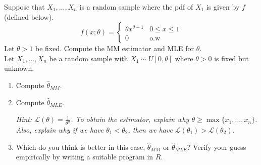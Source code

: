 \exerciseitem Suppose that $X_1, \ldots, X_n$ is a random sample where the pdf of $X_1$ is given by $f$ (defined below).
\[
	f(x;\theta) = 
	\begin{cases}
		\theta x^{\theta-1} & 0\leq x \leq 1 \\
		0 & \text{o.w}
	\end{cases}
\]
Let $\theta > 1$ be fixed. Compute the MM estimator and MLE for $\theta$.\\

\exerciseitem Let $X_1, \ldots, X_n$ be a random sample with $X_1 \sim U[0,\theta]$ where $\theta > 0$ is fixed but unknown.
\begin{enumerate}
	\item Compute $\hat{\theta}_{MM}$.
	\item Compute $\hat{\theta}_{MLE}$. 
	
	\textit{Hint: $\mathcal{L}(\theta) = \frac{1}{\theta^n}$. 
	To obtain the estimator, explain why $\theta \geq \max\{x_1, \ldots, x_n\}$. Also, explain why if we have $\theta_1 < \theta_2$, then we have $\mathcal{L}(\theta_1) > \mathcal{L}(\theta_2)$.} 

\item Which do you think is better in this case, $\hat{\theta}_{MM}$ or $\hat{\theta}_{MLE}$? Verify your guess empirically by writing a suitable program in $R$.
\end{enumerate}
